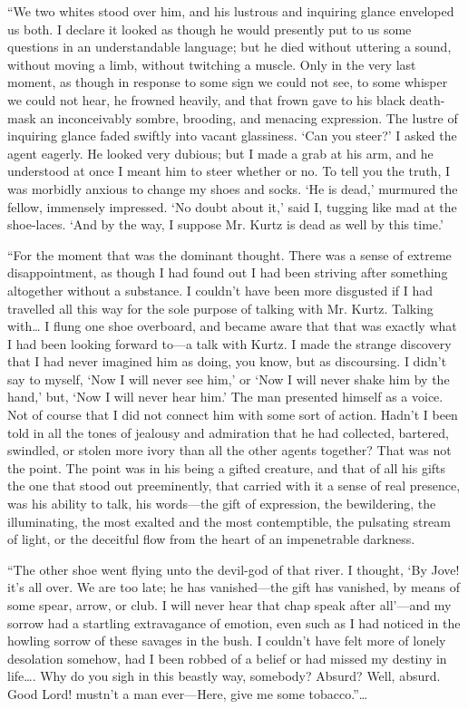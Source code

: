 \documentclass[12pt]{report}
\begin{document}
``We two whites stood over him, and his lustrous and inquiring glance
enveloped us both. I declare it looked as though he would presently put
to us some questions in an understandable language; but he died without
uttering a sound, without moving a limb, without twitching a muscle.
Only in the very last moment, as though in response to some sign we
could not see, to some whisper we could not hear, he frowned heavily,
and that frown gave to his black death-mask an inconceivably sombre,
brooding, and menacing expression. The lustre of inquiring glance faded
swiftly into vacant glassiness. `Can you steer?' I asked the agent
eagerly. He looked very dubious; but I made a grab at his arm, and he
understood at once I meant him to steer whether or no. To tell you the
truth, I was morbidly anxious to change my shoes and socks. `He is
dead,' murmured the fellow, immensely impressed. `No doubt about it,'
said I, tugging like mad at the shoe-laces. `And by the way, I suppose
Mr. Kurtz is dead as well by this time.'

``For the moment that was the dominant thought. There was a sense of
extreme disappointment, as though I had found out I had been striving
after something altogether without a substance. I couldn't have been
more disgusted if I had travelled all this way for the sole purpose of
talking with Mr. Kurtz. Talking with\ldots{} I flung one shoe overboard,
and became aware that that was exactly what I had been looking forward
to---a talk with Kurtz. I made the strange discovery that I had never
imagined him as doing, you know, but as discoursing. I didn't say to
myself, `Now I will never see him,' or `Now I will never shake him by
the hand,' but, `Now I will never hear him.' The man presented himself
as a voice. Not of course that I did not connect him with some sort of
action. Hadn't I been told in all the tones of jealousy and admiration
that he had collected, bartered, swindled, or stolen more ivory than all
the other agents together? That was not the point. The point was in his
being a gifted creature, and that of all his gifts the one that stood
out preeminently, that carried with it a sense of real presence, was his
ability to talk, his words---the gift of expression, the bewildering,
the illuminating, the most exalted and the most contemptible, the
pulsating stream of light, or the deceitful flow from the heart of an
impenetrable darkness.

``The other shoe went flying unto the devil-god of that river. I
thought, `By Jove! it's all over. We are too late; he has vanished---the
gift has vanished, by means of some spear, arrow, or club. I will never
hear that chap speak after all'---and my sorrow had a startling
extravagance of emotion, even such as I had noticed in the howling
sorrow of these savages in the bush. I couldn't have felt more of lonely
desolation somehow, had I been robbed of a belief or had missed my
destiny in life\ldots{}. Why do you sigh in this beastly way, somebody?
Absurd? Well, absurd. Good Lord! mustn't a man ever---Here, give me some
tobacco.''\ldots{}
\end{document}
